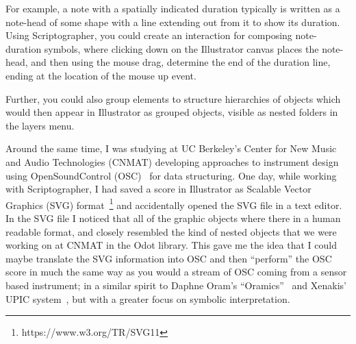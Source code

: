\documentclass{article}
\begin{document}
For example, a note with a spatially indicated duration typically is written as a note-head of some shape with a line extending out from it to show its duration. 
Using Scriptographer, you could create an interaction for composing note-duration symbols, where clicking down on the Illustrator canvas places the note-head, and then using the mouse drag, determine the end of the duration line, ending at the location of the mouse up event.

Further, you could also group elements to structure hierarchies of objects which would then appear in Illustrator as grouped objects, visible as nested folders in the layers menu.


Around the same time, I was studying at UC Berkeley's Center for New Music and Audio Technologies (CNMAT) developing approaches to instrument design using OpenSoundControl (OSC)~\cite{wright:osc} for data structuring. 
One day, while working with Scriptographer, I had saved a score in Illustrator as Scalable Vector Graphics (SVG) format~\footnote{https://www.w3.org/TR/SVG11} and accidentally opened the SVG file in a text editor. 
In the SVG file I noticed that all of the graphic objects where there in a human readable format, and closely resembled the kind of nested objects that we were working on at CNMAT in the Odot library\cite{maccallum2015dynamic}. This gave me the idea that I could maybe translate the SVG information into OSC and then ``perform'' the OSC score in much the same way as you would a stream of OSC coming from a sensor based instrument; in a similar spirit to Daphne Oram's ``Oramics''~\cite{manning2012oramics} and Xenakis' UPIC system~\cite{marino1993upic}, but with a greater focus on symbolic interpretation. 
\end{document}

